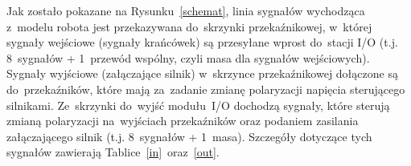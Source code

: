 Jak zostało pokazane na Rysunku~\ref{schemat}, linia sygnałów wychodząca z~modelu robota jest przekazywana do~skrzynki przekaźnikowej, w~której sygnały wejściowe (sygnały krańcówek) są przesyłane wprost do~stacji I/O (t.j. 8~sygnałów + 1~przewód wspólny, czyli masa dla sygnałów wejściowych). Sygnały wyjściowe (załączające silnik) w~skrzynce przekaźnikowej dołączone są do~przekaźników, które mają za~zadanie zmianę polaryzacji napięcia sterującego silnikami. Ze~skrzynki do~wyjść modułu~I/O dochodzą sygnały, które sterują zmianą polaryzacji na~wyjściach przekaźników oraz podaniem zasilania załączającego silnik (t.j. 8~sygnałów + 1~masa). Szczegóły dotyczące tych sygnałów zawierają Tablice~\ref{in}~oraz~\ref{out}.
\begin{table}[!htb]
\begin{center}
\begin{comment}
\begin{tabular}{|c|c|c|l|}\hline
Nazwa  & Adres  & Typ  & Opis  \\   
zmiennej  & zmiennej & zmiennej  &   \\   
 & w sterowniku &  & \\\hline    
Rotate Manual Start  &   I       4.0 & Bool  &    Sterowanie ręczne Rotate - start.   \\\hline                                            
Arm Manual Start   &     I       4.1 &  Bool   &   Sterowanie ręczne Arm - start.      \\\hline                                            
Lift Manual Start   &    I       4.2 &  Bool   &   Sterowanie ręczne Lift - start.             \\\hline                                    
Grab Manual Start   &    I       4.3 &  Bool   &   Sterowanie ręczne Grab - start.             \\\hline                                    
Rotate Manual Dir   &    I       4.4 &  Bool   &   Sterowanie ręczne Rotate - kierunek.        \\\hline                                    
Arm Manual Dir      &    I       4.5 &  Bool   &   Sterowanie ręczne Arm - kierunek.           \\\hline                                    
Lift Manual Dir     &    I       4.6 &  Bool   &   Sterowanie ręczne Lift - kierunek.                                              \\\hline
Grab Manual Dir     &    I       4.7 &  Bool   &   Sterowanie ręczne Grab - kierunek.                                              \\\hline

\end{comment}
\end{center}
\end{table}
